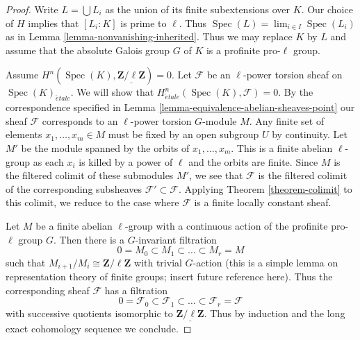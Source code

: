 \documentclass[10pt,a4paper]{amsart}
\theoremstyle{plain}
\theoremstyle{definition}
\theoremstyle{remark}
\numberwithin{equation}{subsection}
\def\lim{\mathop{\mathrm{lim}}\nolimits}
\def\Spec{\mathop{\mathrm{Spec}}}
\def\etale{{\acute{e}tale}}
\begin{document}
\begin{proof}
Write $L = \bigcup L_i$ as the union of its finite subextensions over $K$.
Our choice of $H$ implies that $[L_i : K]$ is prime to $\ell$.
Thus $\Spec(L) = \lim_{i \in I} \Spec(L_i)$ as in
Lemma \ref{lemma-nonvanishing-inherited}.
Thus we may replace $K$ by $L$ and assume that
the absolute Galois group $G$ of $K$ is a
profinite pro-$\ell$ group.

\medskip\noindent
Assume $H^n(\Spec(K), \underline{\mathbf{Z}/\ell\mathbf{Z}}) = 0$.
Let $\mathcal{F}$ be an $\ell$-power torsion sheaf on $\Spec(K)_\etale$.
We will show that $H^n_\etale(\Spec(K), \mathcal{F}) = 0$.
By the correspondence specified in
Lemma \ref{lemma-equivalence-abelian-sheaves-point}
our sheaf $\mathcal{F}$ corresponds to an $\ell$-power torsion
$G$-module $M$. Any finite set of elements $x_1, \ldots, x_m \in M$
must be fixed by an open subgroup $U$ by continuity.
Let $M'$ be the module spanned by the orbits of $x_1, \ldots, x_m$.
This is a finite abelian $\ell$-group
as each $x_i$ is killed by a power of $\ell$
and the orbits are finite. Since $M$ is the filtered colimit of
these submodules $M'$, we see that $\mathcal{F}$ is the filtered
colimit of the corresponding subsheaves $\mathcal{F}' \subset \mathcal{F}$.
Applying Theorem \ref{theorem-colimit} to this colimit, we reduce
to the case where $\mathcal{F}$ is a finite locally constant sheaf.

\medskip\noindent
Let $M$ be a finite abelian $\ell$-group with a continuous action
of the profinite pro-$\ell$ group $G$. Then there is a $G$-invariant
filtration
$$
0 = M_0 \subset M_1 \subset \ldots \subset M_r = M
$$
such that $M_{i + 1}/M_i \cong \mathbf{Z}/\ell \mathbf{Z}$ with
trivial $G$-action (this is a simple lemma on representation
theory of finite groups; insert future reference here).
Thus the corresponding sheaf $\mathcal{F}$ has a filtration
$$
0 = \mathcal{F}_0 \subset \mathcal{F}_1 \subset \ldots \subset
\mathcal{F}_r = \mathcal{F}
$$
with successive quotients isomorphic to
$\underline{\mathbf{Z}/\ell \mathbf{Z}}$.
Thus by induction and the long exact cohomology
sequence we conclude.
\end{proof}
\end{document}
